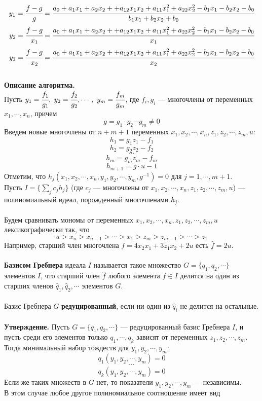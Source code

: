 \documentclass[12pt]{article}
\theoremstyle{definition}
\numberwithin{equation}{section}
\begin{document}
	$$y_1=\cfrac{f-g}{g}=\cfrac{a_0+a_1x_1+a_2x_2++a_{12}x_1x_2+a_{11}x_1^2+a_{22}x_2^2-b_1x_1-b_2x_2-b_0}{b_1x_1+b_2x_2+b_0}$$
	$$y_2=\cfrac{f-g}{x_1}=\cfrac{a_0+a_1x_1+a_2x_2++a_{12}x_1x_2+a_{11}x_1^2+a_{22}x_2^2-b_1x_1-b_2x_2-b_0}{x_1}$$
	$$y_3=\cfrac{f-g}{x_2}=\cfrac{a_0+a_1x_1+a_2x_2++a_{12}x_1x_2+a_{11}x_1^2+a_{22}x_2^2-b_1x_1-b_2x_2-b_0}{x_2}$$
	\\
	\textbf{Описание алгоритма.}\\
	Пусть $y_1=\cfrac{f_1}{g_1},~y_2=\cfrac{f_2}{g_2},\cdots,~y_m=\cfrac{f_m}{g_m}$, где $f_i, g_i$ --- многочлены от переменных $x_1, \cdots, x_n$, причем $$g=g_1\cdot g_2 \cdots g_m \neq 0$$
	Введем новые многочлены от $n+m+1$ переменных $x_1, x_2, \cdots, x_n, z_1, z_2, \cdots, z_m, u$: $$h_1=g_1z_1-f_1$$
	$$h_2=g_2z_2-f_2$$
	$$\cdots$$
	$$h_m=g_mz_m-f_m$$
	$$h_{m+1}=g\cdot u-1$$
	Отметим, что $h_j(x_1, x_2, \cdots, x_n, y_1, y_2, \cdots, y_m, g^{-1})=0$ для $j=1, \cdots, m+1$.\\
	Пусть $I=\{\sum \limits_j c_j h_j\}$ (где $c_j$ --- многочлены от $x_1, x_2, \cdots, x_n, z_1, z_2, \cdots, z_m, u$) --- полиномиальный идеал, порожденный многочленами $h_j$.\\
	\\
	Будем сравнивать мономы от переменных $x_1, x_2, \cdots, x_n, z_1, z_2, \cdots, z_m, u$ лексикографически так, что $$u>x_n>x_{n-1}>\cdots >x_1>z_m>z_{m-1}>\cdots >z_1$$
	Например, старший член многочлена $f=4x_2x_1+3z_1x_2+2u$ есть $\hat f=2u$.\\
	\\
	\textbf{Базисом Гребнера} идеала $I$ называется такое множество $G=\{q_1, q_2, \cdots\}$ элементов $I$, что старший член $\hat f$ любого элемента $f\in I$ делится на один из старших членов $\hat q_1, \hat q_2,\cdots$ элементов $G$.\\
	\\
	Базис Гребнера $G$ \textbf{редуцированный}, если ни один из $\hat q_i$ не делится на остальные.\\
	\\
	\textbf{Утверждение.} Пусть $G=\{q_1, q_2, \cdots\}$ --- редуцированный базис Гребнера $I$, и пусть среди его элементов только $q_1, \cdots, q_k$ зависят от переменных $z_1, z_2, \cdots, z_m$. Тогда минимальный набор тождеств для $y_1, y_2, \cdots, y_m$:
	$$q_1(y_1, y_2, \cdots, y_m)=0$$
	$$\cdots$$
	$$q_k(y_1, y_2, \cdots, y_m)=0$$
	Если же таких множеств в $G$ нет, то показатели $y_1, y_2, \cdots, y_m$ --- независимы.\\
	В этом случае любое другое полиномиальное соотношение имеет вид 
\end{document}
